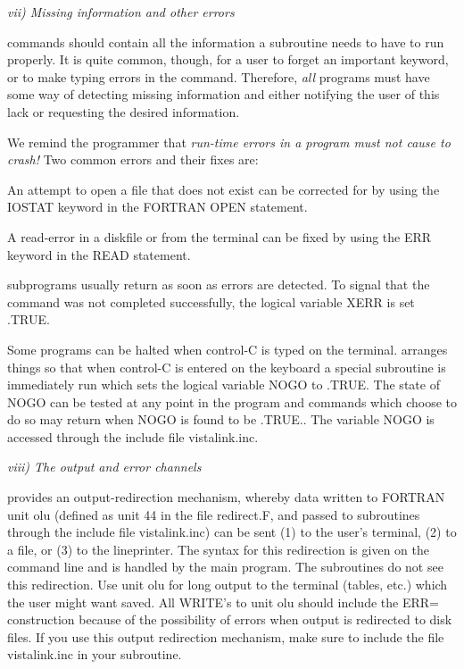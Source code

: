 \Sskip
\centerline {\it vii) Missing information and other errors}

	\V commands should contain all the information a subroutine
needs to have to run properly. It is quite common, though, for a user
to forget an important keyword, or to make typing errors in the
command.  Therefore, {\it all} programs must have some way of
detecting missing information and either notifying the user of this
lack or requesting the desired information. 

	We remind the
programmer that {\it run-time errors in a program must not cause \V \it
to crash!}  Two common errors and their fixes are: 

\hang
{}An attempt to open a file that does not
exist can be corrected for by using the IOSTAT keyword in the FORTRAN
OPEN statement. 

\hang
{}A read-error in a diskfile or from the
terminal can be fixed by using the ERR keyword in the READ statement. 

	\V subprograms usually return as soon as errors are detected.
To signal that the command was not completed successfully, the logical
variable XERR is set .TRUE. 

	Some programs can be halted when control-C is typed on
the terminal.
\V arranges things so that when control-C is entered on the
keyboard a special subroutine is immediately run which
sets the logical variable NOGO to .TRUE.
The state of NOGO can be tested at
any point in the program and commands which choose to do
so may return when NOGO is found to be .TRUE.. The variable NOGO is
accessed through the include file vistalink.inc.
	
\Sskip
\centerline {\it viii) The output and error channels}

	\V provides an output-redirection mechanism, whereby data
written to FORTRAN unit olu (defined as unit 44 in the file redirect.F,
and passed to subroutines through the include file vistalink.inc)
can be sent (1) to the user's terminal, (2)
to a file, or (3) to the lineprinter.  The syntax for this redirection
is given on the command line and is handled by the main program.  The
subroutines do not see this redirection. Use unit olu for long output
to the terminal (tables, etc.) which the user might want saved. 
All WRITE's to unit olu should include the ERR= construction because
of the possibility of errors when output is redirected to disk files.
If you use this output redirection mechanism, make sure to include
the file vistalink.inc in your subroutine.


